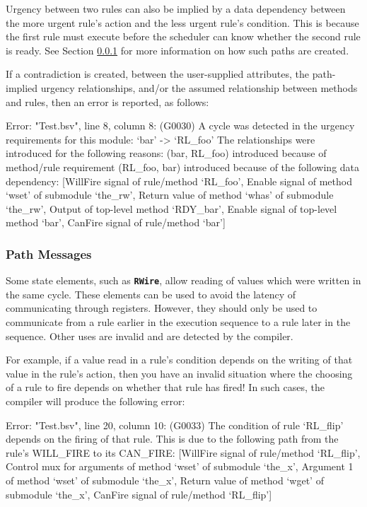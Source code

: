 \documentclass{article}
\newenvironment{centerboxverbatim}
  {\center
   \boxedverbatim}
  {\endboxedverbatim
  {\endcenter }}
\begin{document}
Urgency between two rules can also be implied by a data dependency
between the more urgent rule's action and the less urgent rule's
condition.  This is because the first rule must execute before the
scheduler can know whether the second rule is ready.  See Section
\ref{path-msgs} for more information on how such paths are created.

If a contradiction is created, between the user-supplied attributes,
the path-implied urgency relationships, and/or the assumed relationship
between methods and rules, then an error is reported, as follows:

\begin{centerboxverbatim}
Error: "Test.bsv", line 8, column 8: (G0030)
  A cycle was detected in the urgency requirements for this module:
    `bar' -> `RL_foo'
  The relationships were introduced for the following reasons:
    (bar, RL_foo) introduced because of method/rule requirement
    (RL_foo, bar) introduced because of the following data dependency:
      [WillFire signal of rule/method `RL_foo',
       Enable signal of method `wset' of submodule `the_rw',
       Return value of method `whas' of submodule `the_rw',
       Output of top-level method `RDY_bar',
       Enable signal of top-level method `bar',
       CanFire signal of rule/method `bar']
\end{centerboxverbatim}


\subsubsection{Path Messages}
\label{path-msgs}

Some state elements, such as {\bf\tt RWire}, allow reading of values
which were written in the same cycle.  These elements can be used to
avoid the latency of communicating through registers.  However, they
should only be used to communicate from a rule earlier in the execution
sequence to a rule later in the sequence.  Other uses are invalid
and are detected by the compiler.

For example, if a value read in a rule's condition depends on the
writing of that value in the rule's action, then you have an invalid
situation where the choosing of a rule to fire depends on whether that
rule has fired!  In such cases, the compiler will produce the following
error:

\begin{centerboxverbatim}
Error: "Test.bsv", line 20, column 10: (G0033)
  The condition of rule `RL_flip' depends on the firing of that rule. This is
  due to the following path from the rule's WILL_FIRE to its CAN_FIRE:
    [WillFire signal of rule/method `RL_flip',
     Control mux for arguments of method `wset' of submodule `the_x',
     Argument 1 of method `wset' of submodule `the_x',
     Return value of method `wget' of submodule `the_x',
     CanFire signal of rule/method `RL_flip']
\end{centerboxverbatim}
\end{document}
